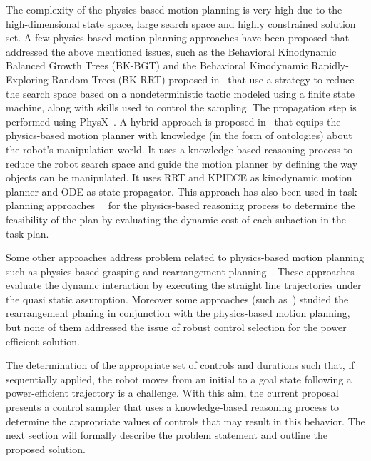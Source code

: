 \documentclass[twocolumn]{svjour3}          %
\begin{document}
The complexity of the physics-based motion planning is very high due to the high-dimensional state space, large search space and highly constrained solution set. A few physics-based motion planning 
approaches have been proposed that addressed the above mentioned issues, such as the 
Behavioral Kinodynamic Balanced Growth Trees (BK-BGT) and  the Behavioral Kinodynamic
Rapidly-Exploring Random Trees (BK-RRT) proposed in~\cite{zickler2009} that use a strategy to reduce the search space  based on a nondeterministic tactic modeled using a finite state machine, along 
with skills used to control the sampling. The propagation step is performed using PhysX~\cite{physx}. A hybrid approach is proposed in~\cite{muhayyuddin2015} that equips the physics-based motion 
planner with knowledge (in the form of ontologies) about the robot's manipulation world. It uses a knowledge-based reasoning process to reduce the robot search space and guide the motion planner by 
defining the way objects can be manipulated. It uses RRT and KPIECE as kinodynamic motion planner and ODE as state propagator. This approach has also been used in task planning 
approaches~\cite{Ali2015}~\cite{RobotAli2015} for the physics-based reasoning process to determine the feasibility of the plan by evaluating the dynamic cost of each subaction in the task plan.

Some other approaches address problem related to physics-based motion planning such as physics-based grasping and rearrangement planning~\cite{dogar2011, dogar2012}. These 
approaches evaluate the dynamic interaction by executing the straight line trajectories under the quasi static assumption. Moreover some approaches (such as~\cite{Haustein2015,stilman2005}) studied 
the rearrangement planing in conjunction with the physics-based motion planning, but none of them addressed the issue of robust control selection for the power efficient solution.

The determination of the appropriate set of controls and durations such that, if sequentially applied, the robot  moves  from an initial to a goal state following a power-efficient 
trajectory is a challenge. With this aim,  the current proposal presents a control sampler that uses a knowledge-based reasoning process to determine the appropriate values of controls that may result 
in this behavior. The next section will formally describe the problem statement and outline the proposed solution.
\end{document}
